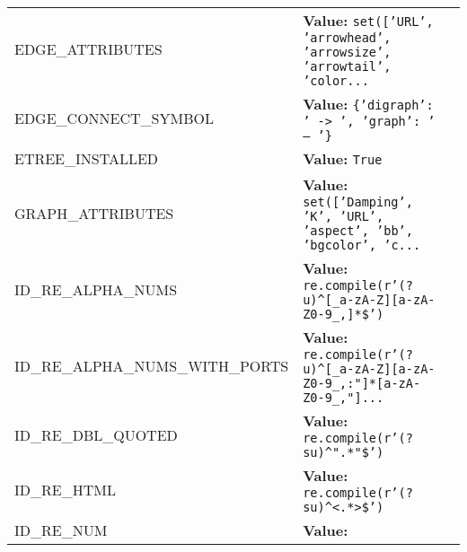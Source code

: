 \begin{longtable}{|p{\varnamewidth}|p{\vardescrwidth}|l}
\cline{1-2}
\raggedright E\-D\-G\-E\-\_\-A\-T\-T\-R\-I\-B\-U\-T\-E\-S\- & \raggedright \textbf{Value:} 
{\tt \texttt{set([}\texttt{'}\texttt{URL}\texttt{'}\texttt{, }\texttt{'}\texttt{arrowhead}\texttt{'}\texttt{, }\texttt{'}\texttt{arrowsize}\texttt{'}\texttt{, }\texttt{'}\texttt{arrowtail}\texttt{'}\texttt{, }\texttt{'}\texttt{color}\texttt{...}}&\\
\cline{1-2}
\raggedright E\-D\-G\-E\-\_\-C\-O\-N\-N\-E\-C\-T\-\_\-S\-Y\-M\-B\-O\-L\- & \raggedright \textbf{Value:} 
{\tt \texttt{\{}\texttt{'}\texttt{digraph}\texttt{'}\texttt{: }\texttt{'}\texttt{ -{\textgreater} }\texttt{'}\texttt{, }\texttt{'}\texttt{graph}\texttt{'}\texttt{: }\texttt{'}\texttt{ -- }\texttt{'}\texttt{\}}}&\\
\cline{1-2}
\raggedright E\-T\-R\-E\-E\-\_\-I\-N\-S\-T\-A\-L\-L\-E\-D\- & \raggedright \textbf{Value:} 
{\tt True}&\\
\cline{1-2}
\raggedright G\-R\-A\-P\-H\-\_\-A\-T\-T\-R\-I\-B\-U\-T\-E\-S\- & \raggedright \textbf{Value:} 
{\tt \texttt{set([}\texttt{'}\texttt{Damping}\texttt{'}\texttt{, }\texttt{'}\texttt{K}\texttt{'}\texttt{, }\texttt{'}\texttt{URL}\texttt{'}\texttt{, }\texttt{'}\texttt{aspect}\texttt{'}\texttt{, }\texttt{'}\texttt{bb}\texttt{'}\texttt{, }\texttt{'}\texttt{bgcolor}\texttt{'}\texttt{, }\texttt{'}\texttt{c}\texttt{...}}&\\
\cline{1-2}
\raggedright I\-D\-\_\-R\-E\-\_\-A\-L\-P\-H\-A\-\_\-N\-U\-M\-S\- & \raggedright \textbf{Value:} 
{\tt re.compile(r'\texttt{(?u)}{\textasciicircum}\texttt{[}\_a\texttt{-}zA\texttt{-}Z\texttt{]}\texttt{[}a\texttt{-}zA\texttt{-}Z0\texttt{-}9\_,\texttt{]}\texttt{*}\$')}&\\
\cline{1-2}
\raggedright I\-D\-\_\-R\-E\-\_\-A\-L\-P\-H\-A\-\_\-N\-U\-M\-S\-\_\-W\-I\-T\-H\-\_\-P\-O\-R\-T\-S\- & \raggedright \textbf{Value:} 
{\tt re.compile(r'\texttt{(?u)}{\textasciicircum}\texttt{[}\_a\texttt{-}zA\texttt{-}Z\texttt{]}\texttt{[}a\texttt{-}zA\texttt{-}Z0\texttt{-}9\_,:"\texttt{]}\texttt{*}\texttt{[}a\texttt{-}zA\texttt{-}Z0\texttt{-}9\_,"\texttt{]}\texttt{...}}&\\
\cline{1-2}
\raggedright I\-D\-\_\-R\-E\-\_\-D\-B\-L\-\_\-Q\-U\-O\-T\-E\-D\- & \raggedright \textbf{Value:} 
{\tt re.compile(r'\texttt{(?su)}{\textasciicircum}".\texttt{*}"\$')}&\\
\cline{1-2}
\raggedright I\-D\-\_\-R\-E\-\_\-H\-T\-M\-L\- & \raggedright \textbf{Value:} 
{\tt re.compile(r'\texttt{(?su)}{\textasciicircum}{\textless}.\texttt{*}{\textgreater}\$')}&\\
\cline{1-2}
\raggedright I\-D\-\_\-R\-E\-\_\-N\-U\-M\- & \raggedright \textbf{Value:} 

\end{longtable}
